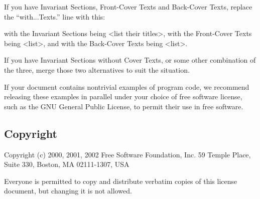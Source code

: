 If you have Invariant Sections, Front-Cover Texts and Back-Cover Texts,
replace the ``with...Texts.'' line with this:

with the Invariant Sections being <list their titles>, with the Front-Cover
Texts being <list>, and with the Back-Cover Texts being <list>.

If you have Invariant Sections without Cover Texts, or some other
combination of the three, merge those two alternatives to suit the
situation.

If your document contains nontrivial examples of program code, we
recommend releasing these examples in parallel under your choice of
free software license, such as the GNU General Public License, to
permit their use in free software.

\subsection{Copyright }

Copyright (c) 2000, 2001, 2002 Free Software Foundation, Inc. 59 Temple
Place, Suite 330, Boston, MA 02111-1307, USA

Everyone is permitted to copy and distribute verbatim copies of this
license document, but changing it is not allowed.%

